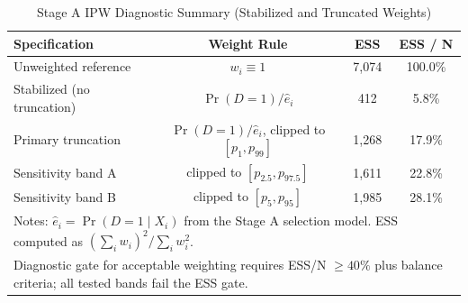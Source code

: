 \begin{table}[H]
\centering
\caption{Stage A IPW Diagnostic Summary (Stabilized and Truncated Weights)}
\label{tab:ipw_diag_summary}
\begin{tabular}{lccc}
\toprule
\textbf{Specification} & \textbf{Weight Rule} & \textbf{ESS} & \textbf{ESS / N} \\
\midrule
Unweighted reference & $w_i \equiv 1$ & 7,074 & 100.0\% \\
Stabilized (no truncation) & $\Pr(D=1)/\hat e_i$ & 412 & 5.8\% \\
Primary truncation & $\Pr(D=1)/\hat e_i$, clipped to $[p_{1},p_{99}]$ & 1,268 & 17.9\% \\
Sensitivity band A & clipped to $[p_{2.5},p_{97.5}]$ & 1,611 & 22.8\% \\
Sensitivity band B & clipped to $[p_{5},p_{95}]$ & 1,985 & 28.1\% \\
\bottomrule
\multicolumn{4}{l}{\footnotesize Notes: $\hat e_i = \Pr(D=1\mid X_i)$ from the Stage A selection model. ESS computed as $ (\sum_i w_i)^2 / \sum_i w_i^2 $.} \\
\multicolumn{4}{l}{\footnotesize Diagnostic gate for acceptable weighting requires ESS/N $\ge 40\%$ plus balance criteria; all tested bands fail the ESS gate.} \\
\end{tabular}
\end{table}
